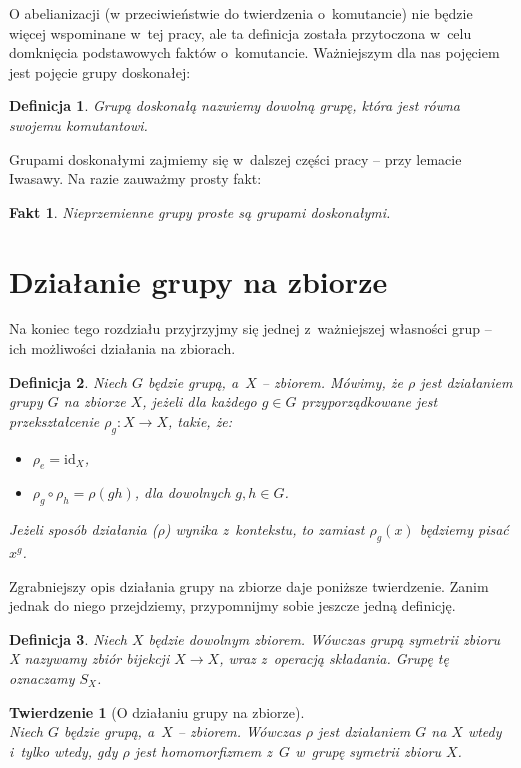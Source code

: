 \documentclass[licencjacka]{pracamgr}
\newtheorem{deff}{Definicja}[section]
\newtheorem{thh}{Twierdzenie}[section]
\newtheorem{fact}{Fakt}[section]
\begin{document}
O abelianizacji (w przeciwieństwie do twierdzenia o~komutancie) nie będzie więcej wspominane w~tej pracy, 
ale ta definicja została przytoczona w~celu domknięcia podstawowych faktów o~komutancie.
Ważniejszym dla nas pojęciem jest pojęcie grupy doskonałej:

\begin{deff}
	\emph{Grupą doskonałą} nazwiemy dowolną grupę, która jest równa swojemu komutantowi.
\end{deff}

Grupami doskonałymi zajmiemy się w~dalszej części pracy -- przy lemacie Iwasawy.
Na razie zauważmy prosty fakt:

\begin{fact}
	Nieprzemienne grupy proste są grupami doskonałymi.
\end{fact}


\section{Działanie grupy na zbiorze}
Na koniec tego rozdziału przyjrzyjmy się jednej z~ważniejszej własności grup -- ich możliwości działania na zbiorach.

\begin{deff}
 	Niech $G$ będzie grupą, a~$X$ -- zbiorem. Mówimy, że \emph{$\rho$ jest działaniem grupy $G$ na zbiorze $X$}, 
	jeżeli dla każdego $g \in G$ przyporządkowane jest przekształcenie $\rho_g\colon X \to X$, takie, że:
	\begin{itemize}
		\item $\rho_e = \mathrm{id}_X$,
		\item $\rho_g \circ \rho_h = \rho(gh)$, dla dowolnych $g, h \in G$.
	\end{itemize}
	Jeżeli sposób działania ($\rho$) wynika z~kontekstu, to zamiast $\rho_g(x)$ będziemy pisać $x^g$.
\end{deff}

Zgrabniejszy opis działania grupy na zbiorze daje poniższe twierdzenie.
Zanim jednak do niego przejdziemy, przypomnijmy sobie jeszcze jedną definicję.

\begin{deff}
	Niech $X$ będzie dowolnym zbiorem. Wówczas \emph{grupą symetrii zbioru X} nazywamy zbiór bijekcji $X \to X$,
	wraz z~operacją składania. Grupę tę oznaczamy $S_X$.
\end{deff}

\begin{thh}[O działaniu grupy na zbiorze] $ $ \\
	Niech $G$ będzie grupą, a~$X$ -- zbiorem. Wówczas $\rho$ jest działaniem $G$ na $X$ wtedy i~tylko wtedy, 
	gdy $\rho$ jest homomorfizmem z~$G$ w~grupę symetrii zbioru $X$.
\end{thh}
\end{document}
